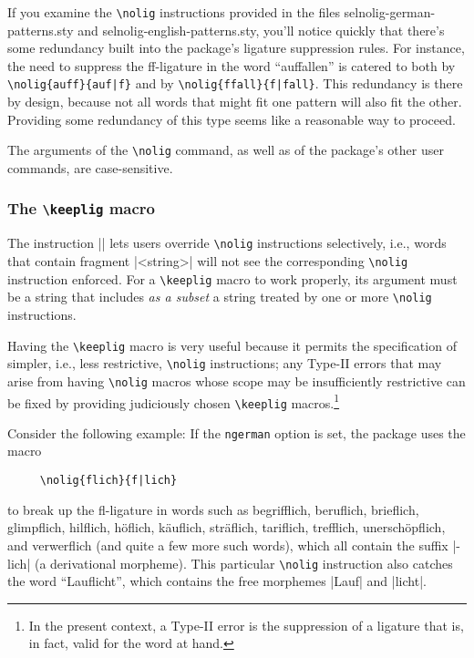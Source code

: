 \documentclass[11pt]{article}
\newcommand{\pkg}[1]{\textsf{#1}}
\newcommand{\opt}[1]{\texttt{#1}}
\newcommand{\cmmd}[1]{\texttt{\textbackslash #1}}
\begin{document}
If you examine the \cmmd{nolig} instructions provided in the files \pkg{selnolig-german-patterns.sty} and \pkg{selnolig-english-patterns.sty}, you'll notice quickly that there's some redundancy built into the package's ligature suppression rules. For instance, the need to suppress the ff-ligature in the word \enquote{auffallen} is catered to both by \Verb+\nolig{auff}{auf|f}+ and by \Verb+\nolig{ffall}{f|fall}+. This redundancy is there by design, because not all words that might fit one pattern will also fit the other. Providing some redundancy of this type seems like a reasonable way to proceed.

The arguments of the \cmmd{nolig} command, as well as of the package's other user commands, are case-sensitive. 

\subsubsection{The \cmmd{keeplig} macro} 
\label{sec:keeplig}


The instruction || lets users override \cmmd{nolig} instructions selectively, i.e., words that contain fragment |<string>| will not see the corresponding \cmmd{nolig} instruction enforced. For a \cmmd{keeplig} macro to work properly, its argument must be a string that includes \emph{as a subset} a string treated by one or more \cmmd{nolig} instructions.

Having the \cmmd{keeplig} macro is very useful because it permits the specification of simpler, i.e., less restrictive, \cmmd{nolig} instructions; any Type-II errors that may arise from having \cmmd{nolig} macros whose scope may be insufficiently restrictive can be fixed by providing judiciously chosen \cmmd{keeplig} macros.\footnote{In the present context, a Type-II error is the suppression of a ligature that is, in fact, valid for the word at hand.}

Consider the following example: If the \opt{ngerman} option is set, the package uses the macro 
\begin{Verbatim}
     \nolig{flich}{f|lich}
\end{Verbatim}
to break up the fl-ligature in words such as begrifflich, beruflich, brieflich, glimpflich, hilflich, höflich, käuflich, sträflich, tariflich, trefflich, unerschöpflich, and verwerflich (and quite a few more such words), which all contain the suffix |-lich| (a derivational morpheme). This particular \cmmd{nolig} instruction also catches the word \enquote{Lauflicht}, which contains the free morphemes |Lauf| and |licht|. 
\end{document}

